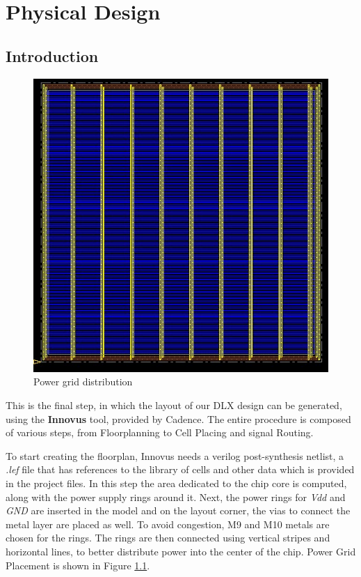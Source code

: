 \chapter{Physical Design}
\label{physical_design}

\section{Introduction}

	\begin{figure}[ht]
	\centering
	\includegraphics[width=\textwidth]{chapters/figures/4.horizontal_lines.jpg} 
	\caption{Power grid distribution}
	\label{fig:power_distribution}  %
	\end{figure}

This is the final step, in which the layout of our DLX design can be generated, using the \textbf{Innovus} tool, provided by Cadence.
The entire procedure is composed of various steps, from Floorplanning to Cell Placing and signal Routing.

To start creating the floorplan, Innovus needs a verilog post-synthesis netlist, a \textit{.lef} file that has references to the library of cells and other data which is
provided in the project files. In this step the area dedicated to the chip core is computed, along with the power supply rings around it.
Next, the power rings for \textit{Vdd} and \textit{GND} are inserted in the model and on the layout corner, the vias to connect the metal layer are placed as well. To avoid congestion, M9 and M10 metals are chosen for the rings.
The rings are then connected using vertical stripes and horizontal lines, to better distribute power into the center of the chip.
Power Grid Placement is shown in Figure \ref{fig:power_distribution}.


